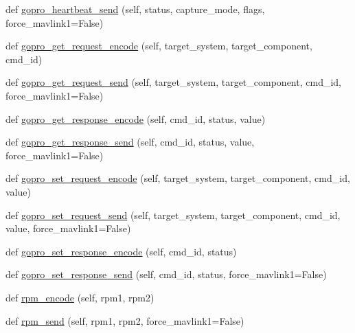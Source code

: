 \begin{DoxyCompactItemize}
\item 
def \hyperlink{classpymavlink_1_1dialects_1_1v10_1_1MAVLink_ab0901f307204cea761992e0fceb0df74}{gopro\+\_\+heartbeat\+\_\+send} (self, status, capture\+\_\+mode, flags, force\+\_\+mavlink1=False)
\item 
def \hyperlink{classpymavlink_1_1dialects_1_1v10_1_1MAVLink_a8eba1b59ef90a02f95ddab006fb5ca43}{gopro\+\_\+get\+\_\+request\+\_\+encode} (self, target\+\_\+system, target\+\_\+component, cmd\+\_\+id)
\item 
def \hyperlink{classpymavlink_1_1dialects_1_1v10_1_1MAVLink_ab33a6a1e8880d70e99b690567b153e11}{gopro\+\_\+get\+\_\+request\+\_\+send} (self, target\+\_\+system, target\+\_\+component, cmd\+\_\+id, force\+\_\+mavlink1=False)
\item 
def \hyperlink{classpymavlink_1_1dialects_1_1v10_1_1MAVLink_a348017e26e757084a726a3a008a3d898}{gopro\+\_\+get\+\_\+response\+\_\+encode} (self, cmd\+\_\+id, status, value)
\item 
def \hyperlink{classpymavlink_1_1dialects_1_1v10_1_1MAVLink_ad7aa24e21e066e7ed2edc4ec94c139ce}{gopro\+\_\+get\+\_\+response\+\_\+send} (self, cmd\+\_\+id, status, value, force\+\_\+mavlink1=False)
\item 
def \hyperlink{classpymavlink_1_1dialects_1_1v10_1_1MAVLink_a265f8faa205d7815e754bf468c12dd13}{gopro\+\_\+set\+\_\+request\+\_\+encode} (self, target\+\_\+system, target\+\_\+component, cmd\+\_\+id, value)
\item 
def \hyperlink{classpymavlink_1_1dialects_1_1v10_1_1MAVLink_a42d73c92254e254e9cc5df58aebcb107}{gopro\+\_\+set\+\_\+request\+\_\+send} (self, target\+\_\+system, target\+\_\+component, cmd\+\_\+id, value, force\+\_\+mavlink1=False)
\item 
def \hyperlink{classpymavlink_1_1dialects_1_1v10_1_1MAVLink_a1bfe58b9b66dea89abb652de4d3bf018}{gopro\+\_\+set\+\_\+response\+\_\+encode} (self, cmd\+\_\+id, status)
\item 
def \hyperlink{classpymavlink_1_1dialects_1_1v10_1_1MAVLink_a25c1e16e6848f472c04ff15b92503286}{gopro\+\_\+set\+\_\+response\+\_\+send} (self, cmd\+\_\+id, status, force\+\_\+mavlink1=False)
\item 
def \hyperlink{classpymavlink_1_1dialects_1_1v10_1_1MAVLink_a143ae067ae1f14db79462ec60e191776}{rpm\+\_\+encode} (self, rpm1, rpm2)
\item 
def \hyperlink{classpymavlink_1_1dialects_1_1v10_1_1MAVLink_a2ca6319e17249ccec4c316ce69b58220}{rpm\+\_\+send} (self, rpm1, rpm2, force\+\_\+mavlink1=False)
\item 

\end{DoxyCompactItemize}
